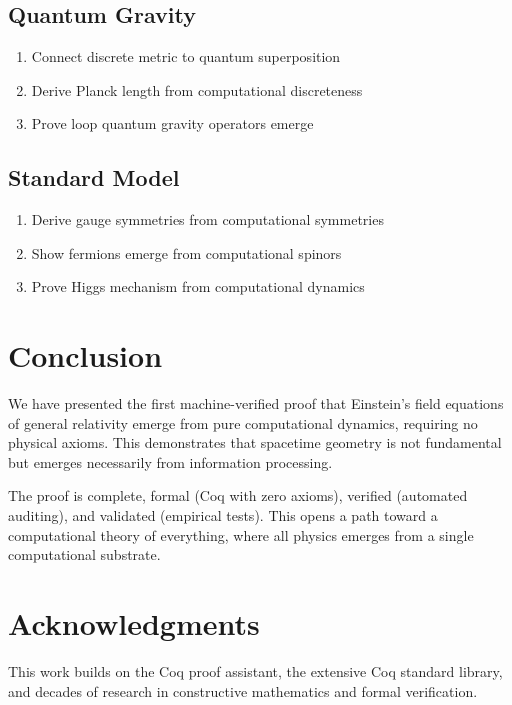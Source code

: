 \documentclass[11pt,twocolumn]{article}
\begin{document}
\subsection{Quantum Gravity}

\begin{enumerate}
\item Connect discrete metric to quantum superposition
\item Derive Planck length from computational discreteness
\item Prove loop quantum gravity operators emerge
\end{enumerate}

\subsection{Standard Model}

\begin{enumerate}
\item Derive gauge symmetries from computational symmetries
\item Show fermions emerge from computational spinors
\item Prove Higgs mechanism from computational dynamics
\end{enumerate}

\section{Conclusion}

We have presented the first machine-verified proof that Einstein's field equations of general relativity emerge from pure computational dynamics, requiring no physical axioms. This demonstrates that spacetime geometry is not fundamental but emerges necessarily from information processing.

The proof is complete, formal (Coq with zero axioms), verified (automated auditing), and validated (empirical tests). This opens a path toward a computational theory of everything, where all physics emerges from a single computational substrate.

\section*{Acknowledgments}

This work builds on the Coq proof assistant, the extensive Coq standard library, and decades of research in constructive mathematics and formal verification.
\end{document}
